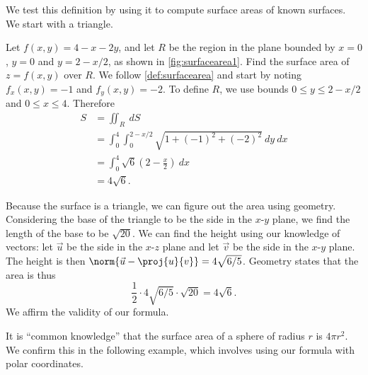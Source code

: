 
We test this definition by using it to compute surface areas of known surfaces. We start with a triangle.

\begin{example}\label{ex_surfacearea1}
Let $f(x,y) = 4-x-2y$, and let $R$ be the region in the plane bounded by $x=0$, $y=0$ and $y=2-x/2$, as shown in \autoref{fig:surfacearea1}. Find the surface area of $z=f(x,y)$ over $R$.
%
%
\solution
We follow \autoref{def:surfacearea} and start by noting $f_x(x,y) = -1$ and $f_y(x,y) = -2$. To define $R$, we use bounds $0\leq y\leq 2-x/2$ and $0\leq x\leq 4$. Therefore
\begin{align*}
S &= \iint_R\ dS \\
  &= \int_0^4\int_0^{2-x/2} \sqrt{1+(-1)^2+(-2)^2}\ dy\ dx\\
	&= \int_0^4 \sqrt{6}\left(2-\frac x2\right)\ dx\\
	&= 4\sqrt{6}.
\end{align*}

Because the surface is a triangle, we can figure out the area using geometry. Considering the base of the triangle to be the side in the $x$-$y$ plane, we find the length of the base to be $\sqrt{20}$. We can find the height using our knowledge of vectors: let $\vec u$ be the side in the $x$-$z$ plane  and let $\vec v$ be the side in the $x$-$y$ plane. The height is then $\norm {\vec u - \proj{u}{v}} = 4\sqrt{6/5}$. Geometry states that the area is thus
\[\frac 12\cdot4\sqrt{6/5}\cdot\sqrt{20} = 4\sqrt{6}.\]
We affirm the validity of our formula.
\end{example}

It is ``common knowledge'' that the surface area of a sphere of radius $r$ is $4\pi r^2$. We confirm this in the following example, which involves using our formula with polar coordinates.

